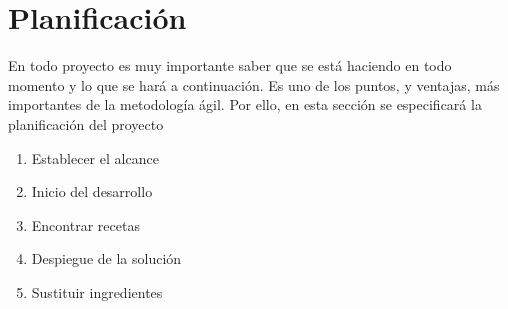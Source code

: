 \section{Planificación}
En todo proyecto es muy importante saber que se está haciendo en todo momento y lo que se hará a continuación. Es uno de los puntos, y ventajas, más importantes de la metodología ágil. Por ello, en esta sección se especificará la planificación del proyecto\:
\begin{enumerate}
    \item Establecer el alcance
    \item Inicio del desarrollo
    \item Encontrar recetas
    \item Despiegue de la solución
    \item Sustituir ingredientes
\end{enumerate}